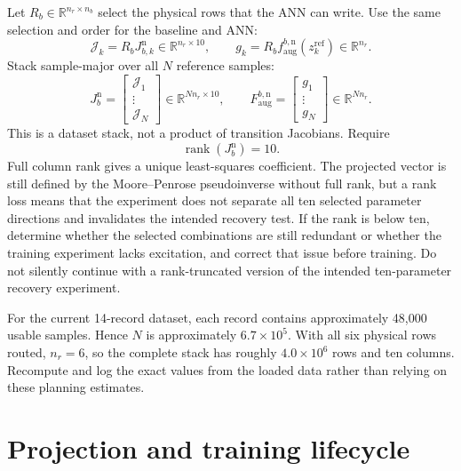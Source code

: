 \documentclass[11pt,a4paper]{article}
\newcommand{\R}{\mathbb R}
\begin{document}
Let \(R_b\in\R^{n_r\times n_b}\) select the physical rows that the ANN can
write. Use the same selection and order for the baseline and ANN:
\begin{equation}
    \mathcal J_k=R_bJ_{b,k}^{\mathrm n}\in\R^{n_r\times10},
    \qquad
    g_k=R_bf_{\mathrm{aug}}^{b,\mathrm n}(z_k^{\mathrm{ref}})
       \in\R^{n_r}.
\end{equation}
Stack sample-major over all \(N\) reference samples:
\begin{equation}
    J_b^{\mathrm n}
    =\begin{bmatrix}\mathcal J_1\\ \vdots\\ \mathcal J_N\end{bmatrix}
       \in\R^{Nn_r\times10},
    \qquad
    F_{\mathrm{aug}}^{b,\mathrm n}
    =\begin{bmatrix}g_1\\ \vdots\\ g_N\end{bmatrix}
       \in\R^{Nn_r}.
    \label{eq:stacks}
\end{equation}
This is a dataset stack, not a product of transition Jacobians. Require
\begin{equation}
    \operatorname{rank}(J_b^{\mathrm n})=10.
    \label{eq:full-column-rank}
\end{equation}
Full column rank gives a unique least-squares coefficient. The projected vector
is still defined by the Moore--Penrose pseudoinverse without full rank, but a
rank loss means that the experiment does not separate all ten selected
parameter directions and invalidates the intended recovery test. If the rank
is below ten, determine whether the selected combinations are still redundant
or whether the training experiment lacks excitation, and correct that issue
before training. Do not silently continue with a rank-truncated version of the
intended ten-parameter recovery experiment.

For the current 14-record dataset, each record contains approximately
48,000 usable samples. Hence \(N\) is approximately \(6.7\times10^5\). With
all six physical rows routed, \(n_r=6\), so the complete stack has roughly
\(4.0\times10^6\) rows and ten columns. Recompute and log the exact values from
the loaded data rather than relying on these planning estimates.

\section{Projection and training lifecycle}
\end{document}

